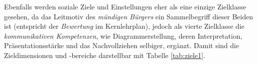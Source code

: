 Ebenfalls werden soziale Ziele und Einstellungen eher als eine einzige Zielklasse gesehen, da das Leitmotiv des \textit{mündigen Bürgers} ein Sammelbegriff dieser Beiden ist (entspricht der \textit{Bewertung} im Kernlehrplan), jedoch als vierte Zielklasse die \textit{kommunikativen Kompetenzen}, wie Diagrammerstellung, deren Interpretation, Präsentationsstärke und das Nachvollziehen selbiger, ergänzt.  
Damit sind die Zieldimensionen und -bereiche darstellbar mit Tabelle \ref{tab:ziele1}.
\vspace*{-3.2cm}
